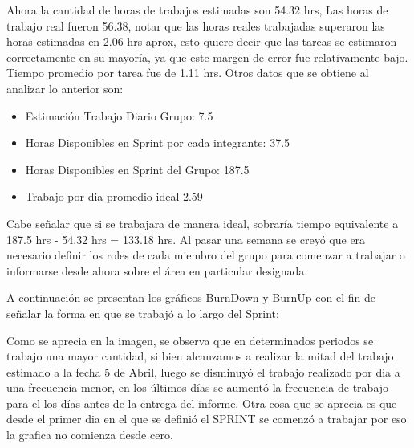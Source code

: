 \documentclass{memoria}
\begin{document}
Ahora la cantidad de horas de trabajos estimadas son 54.32 hrs, Las horas de trabajo real fueron 56.38, notar que las horas reales trabajadas superaron las horas estimadas en 2.06 hrs aprox, esto quiere decir que las tareas se estimaron correctamente en su mayoría, ya que este margen de error fue relativamente bajo. Tiempo promedio por tarea fue de 1.11 hrs. Otros datos que se obtiene al analizar lo anterior son:

\begin{itemize}
	\item Estimación Trabajo Diario Grupo: 7.5 
	\item Horas Disponibles en Sprint por cada integrante: 37.5 
	\item Horas Disponibles en Sprint del Grupo: 187.5 
	\item Trabajo por dia promedio ideal 2.59 
\end{itemize}

Cabe señalar que si se trabajara de manera ideal, sobraría  tiempo equivalente a 187.5 hrs - 54.32 hrs = 133.18 hrs. Al pasar una semana se creyó que era necesario definir los roles de cada miembro del grupo para comenzar a trabajar o informarse desde ahora sobre el área en particular designada.

A continuación se presentan los gráficos BurnDown y BurnUp con el fin de señalar la forma en que se trabajó a lo largo del Sprint:


Como se aprecia en la imagen, se observa que en determinados periodos se trabajo una mayor cantidad, si bien alcanzamos a realizar la mitad del trabajo estimado a la fecha 5 de Abril, luego se disminuyó el trabajo realizado por dia a una frecuencia menor, en los últimos días se aumentó la frecuencia de trabajo para el los días antes de la entrega del informe. Otra cosa que se aprecia es que desde el primer dia en el que se definió el SPRINT se comenzó a trabajar por eso la grafica no comienza desde cero.
\end{document}
